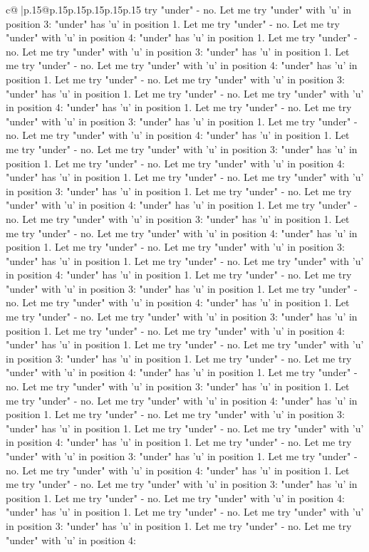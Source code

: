 \documentclass{article}
\begin{document}
{\begin{supertabular}{c@{$\;$}|p{.15\linewidth}@{}p{.15\linewidth}p{.15\linewidth}p{.15\linewidth}p{.15\linewidth}p{.15\linewidth}}
{{{try "under" {-} no. Let me try "under" with 'u' in position 3: "under" has 'u' in position 1. Let me try "under" {-} no. Let me try "under" with 'u' in position 4: "under" has 'u' in position 1. Let me try "under" {-} no. Let me try "under" with 'u' in position 3: "under" has 'u' in position 1. Let me try "under" {-} no. Let me try "under" with 'u' in position 4: "under" has 'u' in position 1. Let me try "under" {-} no. Let me try "under" with 'u' in position 3: "under" has 'u' in position 1. Let me try "under" {-} no. Let me try "under" with 'u' in position 4: "under" has 'u' in position 1. Let me try "under" {-} no. Let me try "under" with 'u' in position 3: "under" has 'u' in position 1. Let me try "under" {-} no. Let me try "under" with 'u' in position 4: "under" has 'u' in position 1. Let me try "under" {-} no. Let me try "under" with 'u' in position 3: "under" has 'u' in position 1. Let me try "under" {-} no. Let me try "under" with 'u' in position 4: "under" has 'u' in position 1. Let me try "under" {-} no. Let me try "under" with 'u' in position 3: "under" has 'u' in position 1. Let me try "under" {-} no. Let me try "under" with 'u' in position 4: "under" has 'u' in position 1. Let me try "under" {-} no. Let me try "under" with 'u' in position 3: "under" has 'u' in position 1. Let me try "under" {-} no. Let me try "under" with 'u' in position 4: "under" has 'u' in position 1. Let me try "under" {-} no. Let me try "under" with 'u' in position 3: "under" has 'u' in position 1. Let me try "under" {-} no. Let me try "under" with 'u' in position 4: "under" has 'u' in position 1. Let me try "under" {-} no. Let me try "under" with 'u' in position 3: "under" has 'u' in position 1. Let me try "under" {-} no. Let me try "under" with 'u' in position 4: "under" has 'u' in position 1. Let me try "under" {-} no. Let me try "under" with 'u' in position 3: "under" has 'u' in position 1. Let me try "under" {-} no. Let me try "under" with 'u' in position 4: "under" has 'u' in position 1. Let me try "under" {-} no. Let me try "under" with 'u' in position 3: "under" has 'u' in position 1. Let me try "under" {-} no. Let me try "under" with 'u' in position 4: "under" has 'u' in position 1. Let me try "under" {-} no. Let me try "under" with 'u' in position 3: "under" has 'u' in position 1. Let me try "under" {-} no. Let me try "under" with 'u' in position 4: "under" has 'u' in position 1. Let me try "under" {-} no. Let me try "under" with 'u' in position 3: "under" has 'u' in position 1. Let me try "under" {-} no. Let me try "under" with 'u' in position 4: "under" has 'u' in position 1. Let me try "under" {-} no. Let me try "under" with 'u' in position 3: "under" has 'u' in position 1. Let me try "under" {-} no. Let me try "under" with 'u' in position 4: "under" has 'u' in position 1. Let me try "under" {-} no. Let me try "under" with 'u' in position 3: "under" has 'u' in position 1. Let me try "under" {-} no. Let me try "under" with 'u' in position 4: "under" has 'u' in position 1. Let me try "under" {-} no. Let me try "under" with 'u' in position 3: "under" has 'u' in position 1. Let me try "under" {-} no. Let me try "under" with 'u' in position 4: }}}
\end{supertabular}}
\end{document}
